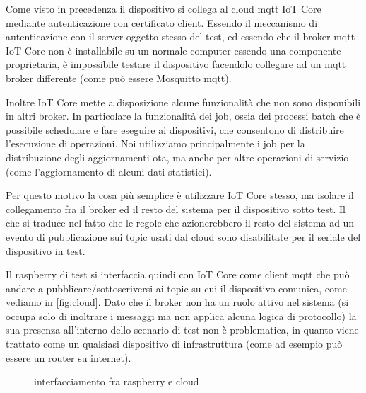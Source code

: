 \documentclass[12pt,a4paper,twoside,titlepage]{book}
\begin{document}
Come visto in precedenza il dispositivo si collega al cloud \Gls{mqtt} IoT Core mediante
autenticazione con certificato client. Essendo il meccanismo di autenticazione con il
server oggetto stesso del test, ed essendo che il broker \Gls{mqtt} IoT Core non è installabile
su un normale computer essendo una componente proprietaria, è impossibile testare il
dispositivo facendolo collegare ad un \Gls{mqtt} broker differente (come può essere Mosquitto \Gls{mqtt}).

Inoltre IoT Core mette a disposizione alcune funzionalità che non sono disponibili in
altri broker. In particolare la funzionalità dei job, ossia dei processi batch che è
possibile schedulare e fare eseguire ai dispositivi, che consentono di distribuire l'esecuzione
di operazioni. Noi utilizziamo principalmente i job per la distribuzione degli aggiornamenti \acrshort{ota},
ma anche per altre operazioni di servizio (come l'aggiornamento di alcuni dati statistici).

Per questo motivo la cosa più semplice è utilizzare IoT Core stesso, ma isolare il collegamento
fra il broker ed il resto del sistema per il dispositivo sotto test. Il che si traduce nel
fatto che le regole che azionerebbero il resto del sistema ad un evento di pubblicazione
sui \gls{topic} usati dal cloud sono disabilitate per il seriale del dispositivo in test.

Il raspberry di test si interfaccia quindi con IoT Core come client \Gls{mqtt} che può
andare a pubblicare/sottoscriversi ai \gls{topic} su cui il dispositivo comunica, come vediamo in \autoref{fig:cloud}.
Dato che il broker non ha un ruolo attivo nel sistema (si occupa solo di inoltrare i messaggi ma non
applica alcuna logica di protocollo) la sua presenza all'interno dello scenario di test non
è problematica, in quanto viene trattato come un qualsiasi dispositivo di infrastruttura
(come ad esempio può essere un router su internet).

\begin{figure}[h]
    \centering
    \caption{interfacciamento fra raspberry e cloud}
    \label{fig:cloud}
\end{figure}
\end{document}
